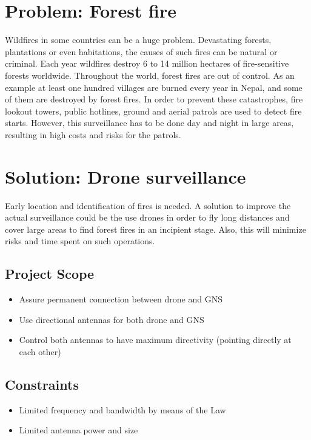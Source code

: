 \section{Problem: Forest fire}\label{sec:problem}
Wildfires in some countries can be a huge problem. Devastating forests, plantations or even habitations, the causes of such fires can be natural or criminal.
Each year wildfires destroy 6 to 14 million hectares of fire-sensitive forests worldwide. Throughout the world, forest fires are out of control. As an example at least one hundred villages are burned every year in Nepal, and some of them are destroyed by forest fires.
In order to prevent these catastrophes, fire lookout towers, public hotlines, ground and aerial patrols are used to detect fire starts. However, this surveillance has to be done day and night in large areas, resulting in high costs and risks for the patrols.

\section{Solution: Drone surveillance}\label{sec:solution}
Early location and identification of fires is needed. A solution to improve the actual surveillance could be the use drones in order to fly long distances and cover large areas to find forest fires in an incipient stage. Also, this will minimize risks and time spent on such operations. 

\subsection{Project Scope}
\begin{itemize}  
        \item Assure permanent connection between drone and GNS
        \item Use directional antennas for both drone and GNS 
        \item Control both antennas to have maximum directivity (pointing directly at each other)
\end{itemize}

\subsection{Constraints}
\begin{itemize}  
        \item Limited frequency and bandwidth by means of the Law
        \item Limited antenna power and size
\end{itemize}

